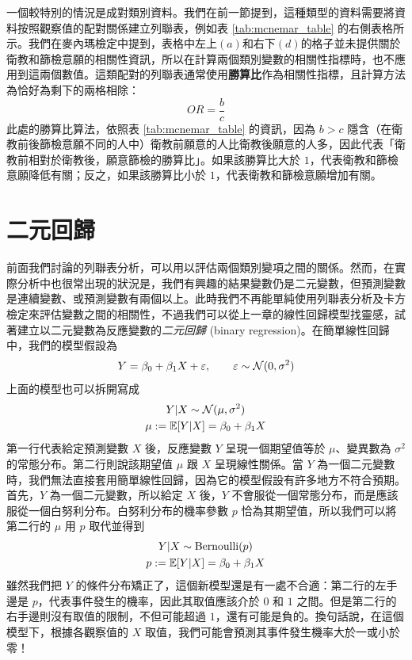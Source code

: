     \medskip

    一個較特別的情況是成對類別資料。我們在前一節提到，這種類型的資料需要將資料按照觀察值的配對關係建立列聯表，例如表 \ref{tab:mcnemar_table} 的右側表格所示。我們在麥內瑪檢定中提到，表格中左上$(a)$和右下$(d)$的格子並未提供關於衛教和篩檢意願的相關性資訊，所以在計算兩個類別變數的相關性指標時，也不應用到這兩個數值。這類配對的列聯表通常使用\textbf{勝算比}作為相關性指標，且計算方法為恰好為剩下的兩格相除：
    \smallskip
    \[OR = \frac{b}{c}\]
    \smallskip
    此處的勝算比算法，依照表 \ref{tab:mcnemar_table} 的資訊，因為 $b>c$ 隱含（在衛教前後篩檢意願不同的人中）衛教前願意的人比衛教後願意的人多，因此代表「衛教前相對於衛教後，願意篩檢的勝算比」。如果該勝算比大於 $1$，代表衛教和篩檢意願降低有關；反之，如果該勝算比小於 $1$，代表衛教和篩檢意願增加有關。

\section{二元回歸}

    前面我們討論的列聯表分析，可以用以評估兩個類別變項之間的關係。然而，在實際分析中也很常出現的狀況是，我們有興趣的結果變數仍是二元變數，但預測變數是連續變數、或預測變數有兩個以上。此時我們不再能單純使用列聯表分析及卡方檢定來評估變數之間的相關性，不過我們可以從上一章的線性回歸模型找靈感，試著建立以二元變數為反應變數的\textit{二元回歸} (binary regression)。在簡單線性回歸中，我們的模型假設為
    \smallskip
    \[Y = \beta_0 + \beta_1 X + \varepsilon, \qquad \varepsilon \sim \mathcal{N}(0,\sigma^2)\]
    \smallskip
    上面的模型也可以拆開寫成
    \begin{gather*}
        Y|X \sim \mathcal{N}(\mu, \sigma^2)\\
        \mu := \mathbb{E}[Y|X] = \beta_0 + \beta_1 X
    \end{gather*}
    第一行代表給定預測變數 $X$ 後，反應變數 $Y$ 呈現一個期望值等於 $\mu$、變異數為 $\sigma^2$ 的常態分布。第二行則說該期望值 $\mu$ 跟 $X$ 呈現線性關係。當 $Y$ 為一個二元變數時，我們無法直接套用簡單線性回歸，因為它的模型假設有許多地方不符合預期。首先，$Y$ 為一個二元變數，所以給定 $X$ 後，$Y$ 不會服從一個常態分布，而是應該服從一個白努利分布。白努利分布的機率參數 $p$ 恰為其期望值，所以我們可以將第二行的 $\mu$ 用 $p$ 取代並得到
    \begin{gather*}
        Y|X \sim \text{Bernoulli}(p)\\
        p := \mathbb{E}[Y|X] = \beta_0 + \beta_1 X
    \end{gather*}
    雖然我們把 $Y$ 的條件分布矯正了，這個新模型還是有一處不合適：第二行的左手邊是 $p$，代表事件發生的機率，因此其取值應該介於 $0$ 和 $1$ 之間。但是第二行的右手邊則沒有取值的限制，不但可能超過 $1$，還有可能是負的。換句話說，在這個模型下，根據各觀察值的 $X$ 取值，我們可能會預測其事件發生機率大於一或小於零！

